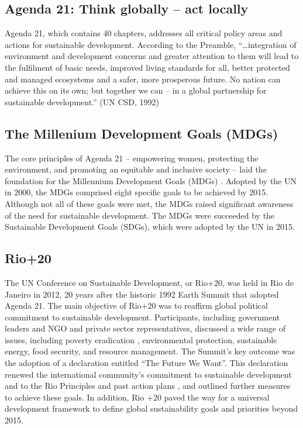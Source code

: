 \documentclass[
  a4paper,
  openany]{book}
\begin{document}
\subsection{Agenda 21: Think globally -- act
locally}\label{agenda-21-think-globally-act-locally}

Agenda 21, which contains 40 chapters, addresses all critical policy
areas and actions for sustainable development. According to the
Preamble, ``\ldots integration of environment and development concerns
and greater attention to them will lead to the fulfilment of basic
needs, improved living standards for all, better protected and managed
ecosystems and a safer, more prosperous future. No nation can achieve
this on its own; but together we can -- in a global partnership for
sustainable development.'' (UN CSD, 1992)

\subsection{The Millenium Development Goals
(MDGs)}\label{the-millenium-development-goals-mdgs}

The core principles of Agenda 21 -- empowering women, protecting the
environment, and promoting an equitable and inclusive society -- laid
the foundation for the Millennium Development Goals (MDGs) . Adopted by
the UN in 2000, the MDGs comprised eight specific goals to be achieved
by 2015. Although not all of these goals were met, the MDGs raised
significant awareness of the need for sustainable development. The MDGs
were succeeded by the Sustainable Development Goals (SDGs), which were
adopted by the UN in 2015.

\subsection{Rio+20}\label{rio20}

The UN Conference on Sustainable Development, or Rio+20, was held in Rio
de Janeiro in 2012, 20 years after the historic 1992 Earth Summit that
adopted Agenda 21. The main objective of Rio+20 was to reaffirm global
political commitment to sustainable development. Participants, including
government leaders and NGO and private sector representatives, discussed
a wide range of issues, including poverty eradication , environmental
protection, sustainable energy, food security, and resource management.
The Summit's key outcome was the adoption of a declaration entitled
``The Future We Want''. This declaration renewed the international
community's commitment to sustainable development and to the Rio
Principles and past action plans , and outlined further measures to
achieve these goals. In addition, Rio +20 paved the way for a universal
development framework to define global sustainability goals and
priorities beyond 2015.
\end{document}
